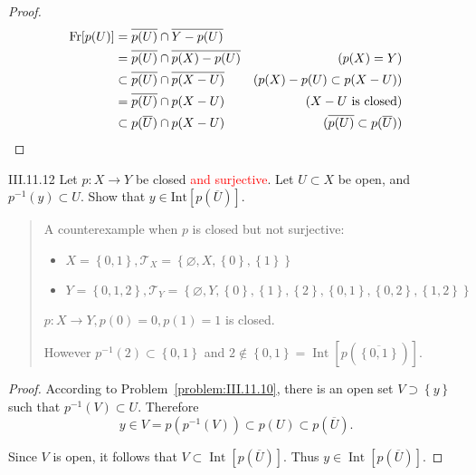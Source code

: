 \begin{proof}
    \begingroup
    \allowdisplaybreaks%
    \begin{align*}
        \operatorname{Fr}[p(U)] & = \overline{p(U)} \cap \overline{Y - p(U)}                                                   \\
                                & = \overline{p(U)} \cap \overline{p(X) - p(U)}    & (p(X) = Y)                                \\
                                & \subset \overline{p(U)} \cap \overline{p(X - U)} & (p(X) - p(U) \subset p(X - U))            \\
                                & = \overline{p(U)} \cap p(X - U)                  & \text{(\( X - U \) is closed)}            \\
                                & \subset p(\overline{U}) \cap p(X - U)            & (\overline{p(U)} \subset p(\overline{U}))
    \end{align*}
    \endgroup
\end{proof}

\begin{problem}{III.11.12}
Let \( p: X \to Y \) be closed \textcolor{red}{and surjective}. Let \( U \subset X \) be open, and \( p^{-1}(y) \subset U \). Show that \( y \in \text{Int}[p(\overline{U})] \).
\end{problem}

\begin{quote}
    A counterexample when \( p \) is closed but not surjective:
    \begin{itemize}
        \item \( X = \left\{ 0, 1 \right\}, \mathscr{T}_{X} = \left\{ \varnothing, X, \left\{ 0 \right\}, \left\{ 1 \right\} \right\} \)
        \item \( Y = \left\{ 0, 1, 2 \right\}, \mathscr{T}_{Y} = \left\{ \varnothing, Y, \left\{ 0 \right\}, \left\{ 1 \right\}, \left\{ 2 \right\}, \left\{ 0, 1 \right\}, \left\{ 0, 2 \right\}, \left\{ 1, 2 \right\} \right\} \)
    \end{itemize}
    \( p: X \to Y, p(0) = 0, p(1) = 1 \) is closed.

    However \( p^{-1}(2) \subset \left\{ 0, 1 \right\} \) and \( 2 \notin \left\{ 0, 1 \right\} = \operatorname{Int}\left\lbrack p(\overline{\left\{ 0, 1 \right\}}) \right\rbrack \).
\end{quote}

\begin{proof}
    According to Problem~\ref{problem:III.11.10}, there is an open set \( V \supset \left\{ y \right\} \) such that \( p^{-1}(V) \subset U \). Therefore
    \[
        y \in V = p(p^{-1}(V)) \subset p(U) \subset p(\overline{U}).
    \]

    Since \( V \) is open, it follows that \( V \subset \operatorname{Int}\left\lbrack p(\overline{U}) \right\rbrack \). Thus \( y \in \operatorname{Int}\left\lbrack p(\overline{U}) \right\rbrack \).
\end{proof}


